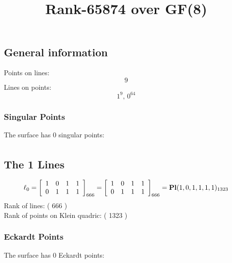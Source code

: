 \documentclass{article}
\newcommand\setTBstruts{\def\T{\rule{0pt}{2.6ex}}%
\def\B{\rule[-1.2ex]{0pt}{0pt}}}
\begin{document}
 
\setTBstruts



{\allowdisplaybreaks%






\title{Rank-65874 over GF(8)}
\author{}%
\maketitle%
%
{}



\subsection*{General information}
Points on lines:
$$
9$$
Lines on points:
$$
1^9,\,0^{64}$$
\subsubsection*{Singular Points}
The surface has 0 singular points:\\
\begin{align*}
\end{align*}
\subsection*{The 1 Lines}
$$
\ell_{0} = 
\left[
\begin{array}{*{4}{r}}
1 & 0 & 1 & 1\\
0 & 1 & 1 & 1\\
\end{array}
\right]
_{666}
=
\left[
\begin{array}{*{4}c}
1  & 0  & 1  & 1\\
0  & 1  & 1  & 1\\
\end{array}
\right]_{666}
={\rm\bf Pl}(1,0,1,1,1,1 )_{1323}$$
Rank of lines: ( 666 )\\
Rank of points on Klein quadric: ( 1323 )\\
\subsubsection*{Eckardt Points}
The surface has 0 Eckardt points:\\
}
\end{document}
